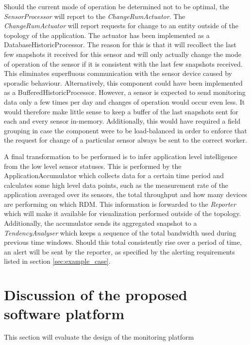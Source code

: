 Should the current mode of operation be determined not to be optimal, the \emph{SensorProcessor} will report to the \emph{ChangeRumActuator}. The \emph{ChangeRumActuator} will report requests for change to an entity outside of the topology of the application. The actuator has been implemented as a DatabaseHistoricProcessor. The reason for this is that it will recollect the last few snapshots it received for this sensor and will only actually change the mode of operation of the sensor if it is consistent with the last few snapshots received. This eliminates superfluous communication with the sensor device caused by sporadic behaviour. Alternatively, this component could have been implemented as a BufferedHistoricProcessor. However, a sensor is expected to send monitoring data only a few times per day and changes of operation would occur even less. It would therefore make little sense to keep a buffer of the last snapshots sent for each and every sensor in-memory. Additionally, this would have required a field grouping in case the component were to be load-balanced in order to enforce that the request for change of a particular sensor always be sent to the correct worker.

A final transformation to be performed is to infer application level intelligence from the low level sensor statuses. This is performed by the ApplicationAccumulator which collects data for a certain time period and calculates some high level data points, such as the measurement rate of the application averaged over its sensors, the total throughput and how many devices are performing on which RDM. This information is forwarded to the \emph{Reporter} which will make it available for visualization performed outside of the topology. Additionally, the accumulator sends its aggregated snapshot to a \emph{TendencyAnalyser} which keeps a sequence of the total bandwidth used during previous time windows. Should this total consistently rise over a period of time, an alert will be sent by the reporter, as specified by the alerting requirements listed in section \ref{sec:example_case}.
	
\section{Discussion of the proposed software platform}
This section will evaluate the design of the monitoring platform

